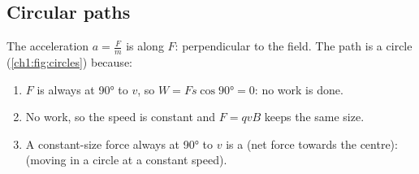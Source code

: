 \subsection{Circular paths}
The acceleration $a = \frac{F}{m}$ is along $F$: perpendicular to the field.
The path is a circle (\cref{ch1:fig:circles}) because:
\begin{enumerate}
  \item $F$ is always at \ang{90} to $v$, so $W = Fs\cos\ang{90} = 0$: no work is done.
  \item No work, so the speed is constant and $F = qvB$ keeps the same size.
  \item A constant-size force always at \ang{90} to $v$ is a  (net force towards the centre): 
        (moving in a circle at a constant speed).
\end{enumerate}

